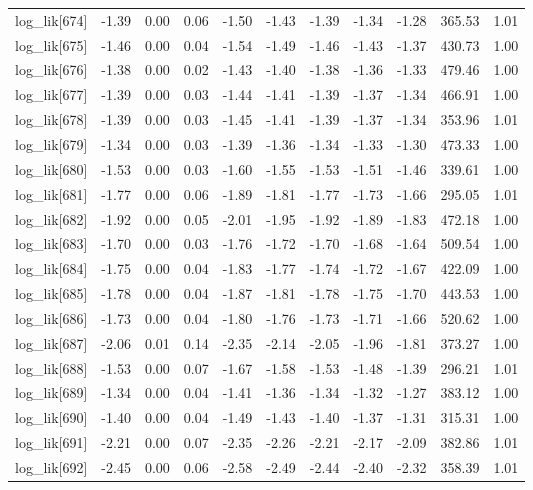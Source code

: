 \begin{table}[ht]
\begin{tabular}{rrrrrrrrrrr}
  log\_lik[674] & -1.39 & 0.00 & 0.06 & -1.50 & -1.43 & -1.39 & -1.34 & -1.28 & 365.53 & 1.01 \\ 
  log\_lik[675] & -1.46 & 0.00 & 0.04 & -1.54 & -1.49 & -1.46 & -1.43 & -1.37 & 430.73 & 1.00 \\ 
  log\_lik[676] & -1.38 & 0.00 & 0.02 & -1.43 & -1.40 & -1.38 & -1.36 & -1.33 & 479.46 & 1.00 \\ 
  log\_lik[677] & -1.39 & 0.00 & 0.03 & -1.44 & -1.41 & -1.39 & -1.37 & -1.34 & 466.91 & 1.00 \\ 
  log\_lik[678] & -1.39 & 0.00 & 0.03 & -1.45 & -1.41 & -1.39 & -1.37 & -1.34 & 353.96 & 1.01 \\ 
  log\_lik[679] & -1.34 & 0.00 & 0.03 & -1.39 & -1.36 & -1.34 & -1.33 & -1.30 & 473.33 & 1.00 \\ 
  log\_lik[680] & -1.53 & 0.00 & 0.03 & -1.60 & -1.55 & -1.53 & -1.51 & -1.46 & 339.61 & 1.00 \\ 
  log\_lik[681] & -1.77 & 0.00 & 0.06 & -1.89 & -1.81 & -1.77 & -1.73 & -1.66 & 295.05 & 1.01 \\ 
  log\_lik[682] & -1.92 & 0.00 & 0.05 & -2.01 & -1.95 & -1.92 & -1.89 & -1.83 & 472.18 & 1.00 \\ 
  log\_lik[683] & -1.70 & 0.00 & 0.03 & -1.76 & -1.72 & -1.70 & -1.68 & -1.64 & 509.54 & 1.00 \\ 
  log\_lik[684] & -1.75 & 0.00 & 0.04 & -1.83 & -1.77 & -1.74 & -1.72 & -1.67 & 422.09 & 1.00 \\ 
  log\_lik[685] & -1.78 & 0.00 & 0.04 & -1.87 & -1.81 & -1.78 & -1.75 & -1.70 & 443.53 & 1.00 \\ 
  log\_lik[686] & -1.73 & 0.00 & 0.04 & -1.80 & -1.76 & -1.73 & -1.71 & -1.66 & 520.62 & 1.00 \\ 
  log\_lik[687] & -2.06 & 0.01 & 0.14 & -2.35 & -2.14 & -2.05 & -1.96 & -1.81 & 373.27 & 1.00 \\ 
  log\_lik[688] & -1.53 & 0.00 & 0.07 & -1.67 & -1.58 & -1.53 & -1.48 & -1.39 & 296.21 & 1.01 \\ 
  log\_lik[689] & -1.34 & 0.00 & 0.04 & -1.41 & -1.36 & -1.34 & -1.32 & -1.27 & 383.12 & 1.00 \\ 
  log\_lik[690] & -1.40 & 0.00 & 0.04 & -1.49 & -1.43 & -1.40 & -1.37 & -1.31 & 315.31 & 1.00 \\ 
  log\_lik[691] & -2.21 & 0.00 & 0.07 & -2.35 & -2.26 & -2.21 & -2.17 & -2.09 & 382.86 & 1.01 \\ 
  log\_lik[692] & -2.45 & 0.00 & 0.06 & -2.58 & -2.49 & -2.44 & -2.40 & -2.32 & 358.39 & 1.01 \\ 

\end{tabular}
\end{table}
